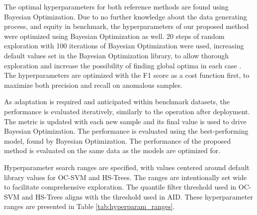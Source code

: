 The optimal hyperparameters for both reference methods are found using Bayesian Optimization. Due to no further knowledge about the data generating process, and equity in benchmark, the hyperparameters of our proposed method were optimized using Bayesian Optimization as well. 20 steps of random exploration with 100 iterations of Bayesian Optimization were used, increasing default values set in the Bayesian Optimization library, to allow thorough exploration and increase the possibility of finding global optima in each case \citep{Nogueira2014}. The hyperparameters are optimized with the F1 score as a cost function first, to maximize both precision and recall on anomalous samples. %

As adaptation is required and anticipated within benchmark datasets, the performance is evaluated iteratively, similarly to the operation after deployment. The metric is updated with each new sample and its final value is used to drive Bayesian Optimization. The performance is evaluated using the best-performing model, found by Bayesian Optimization. The performance of the proposed method is evaluated on the same data as the models are optimized for.

Hyperparameter search ranges are specified, with values centered around default library values for OC-SVM and HS-Trees. The ranges are intentionally set wide to facilitate comprehensive exploration. The quantile filter threshold used in OC-SVM and HS-Trees aligns with the threshold used in AID. These hyperparameter ranges are presented in Table \ref{tab:hyperparam_ranges}.


